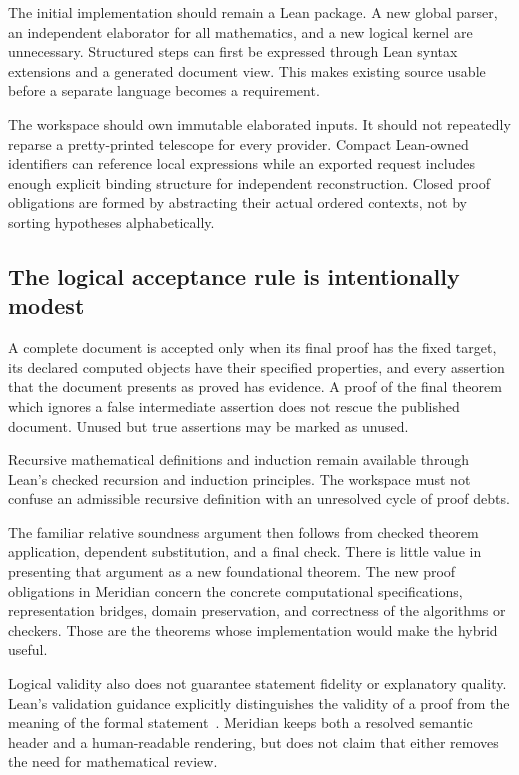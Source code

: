 \documentclass[11pt,a4paper]{article}
\theoremstyle{remark}
\begin{document}
The initial implementation should remain a Lean package. A new global parser,
an independent elaborator for all mathematics, and a new logical kernel are
unnecessary. Structured steps can first be expressed through Lean syntax
extensions and a generated document view. This makes existing source usable
before a separate language becomes a requirement.

The workspace should own immutable elaborated inputs. It should not repeatedly
reparse a pretty-printed telescope for every provider. Compact Lean-owned
identifiers can reference local expressions while an exported request includes
enough explicit binding structure for independent reconstruction. Closed proof
obligations are formed by abstracting their actual ordered contexts, not by
sorting hypotheses alphabetically.

\subsection{The logical acceptance rule is intentionally modest}
A complete document is accepted only when its final proof has the fixed target,
its declared computed objects have their specified properties, and every
assertion that the document presents as proved has evidence. A proof of the final
theorem which ignores a false intermediate assertion does not rescue the
published document. Unused but true assertions may be marked as unused.

Recursive mathematical definitions and induction remain available through
Lean's checked recursion and induction principles. The workspace must not confuse
an admissible recursive definition with an unresolved cycle of proof debts.

The familiar relative soundness argument then follows from checked theorem
application, dependent substitution, and a final check. There is little value
in presenting that argument as a new foundational theorem. The new proof
obligations in Meridian concern the concrete computational specifications,
representation bridges, domain preservation, and correctness of the algorithms
or checkers. Those are the theorems whose implementation would make the hybrid
useful.

Logical validity also does not guarantee statement fidelity or explanatory
quality. Lean's validation guidance explicitly distinguishes the validity of a
proof from the meaning of the formal statement~\cite{leanvalidation}. Meridian
keeps both a resolved semantic header and a human-readable rendering, but does
not claim that either removes the need for mathematical review.
\end{document}
